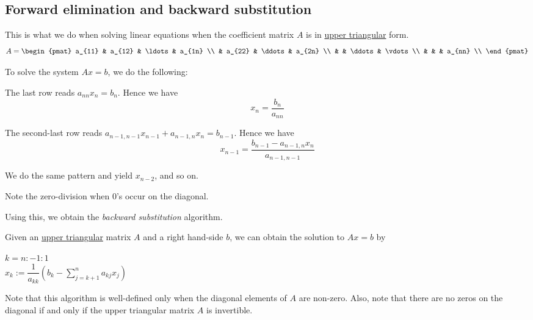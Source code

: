 \subsection{Forward elimination and backward substitution}\label{bc48480}

\label{a0fa0a9}

This is what we do when solving linear equations when the coefficient matrix
$A$ is in \href{c39b6bf}{upper triangular} form.
$$
  A=\begin{pmat}
    a_{11} & a_{12} & \ldots & a_{1n} \\
           & a_{22} & \ddots & a_{2n} \\
           &        & \ddots & \vdots \\
           &        &        & a_{nn} \\
  \end{pmat}
$$

To solve the system $Ax=b$, we do the following:
\begin{enumerati}
  \item The last row reads $a_{nn}x_n=b_n$. Hence we have
  $$
    x_n=\frac{b_n}{a_{nn}}
  $$
  \item The second-last row reads $a_{n-1,n-1}x_{n-1}+a_{n-1,n}x_n=b_{n-1}$.
        Hence we have
  $$
    x_{n-1}=\frac{b_{n-1}-a_{n-1,n}x_n}{a_{n-1,n-1}}
  $$
  \item We do the same pattern and yield $x_{n-2}$, and so on.
\end{enumerati}

Note the zero-division when 0's occur on the diagonal.

Using this, we obtain the \textit{backward substitution} algorithm.

\label{fe9f7f5}

Given an \href{c39b6bf}{upper triangular} matrix $A$ and a right hand-side $b$,
we can obtain the solution to $Ax=b$ by

\begin{pseudocode}
  \For $k=n:-1:1$ \\
  \tab $x_k:=\dfrac1{a_{kk}}\left(b_k-\sum_{j=k+1}^na_{kj}x_j\right)$ \\
  \End
\end{pseudocode}

Note that this algorithm is well-defined only when the diagonal elements of $A$
are non-zero. Also, note that there are no zeros on the diagonal if and only if
the upper triangular matrix $A$ is invertible.

